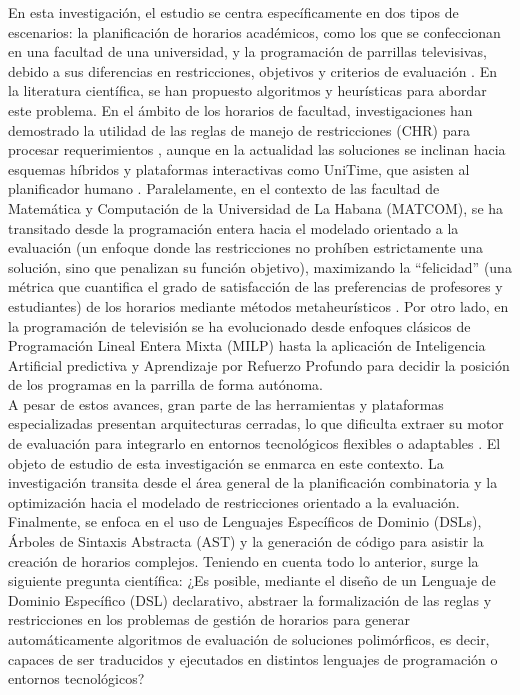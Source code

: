 \documentclass[12pt]{article}
\begin{document}
En esta investigación, el estudio se centra específicamente en dos tipos de escenarios: la planificación de horarios académicos, como los que se confeccionan en una facultad de una universidad, y la programación de parrillas televisivas, debido a sus diferencias en restricciones, objetivos y criterios de evaluación \cite{schaerf1999, garcia2011}. En la literatura científica, se han propuesto algoritmos y heurísticas para abordar este problema. En el ámbito de los horarios de facultad, investigaciones han demostrado la utilidad de las reglas de manejo de restricciones (CHR) para procesar requerimientos \cite{abdennadher2000}, aunque en la actualidad las soluciones se inclinan hacia esquemas híbridos y plataformas interactivas como UniTime, que asisten al planificador humano \cite{muller2010}. Paralelamente, en el contexto de las facultad de Matemática y Computación de la Universidad de La Habana (MATCOM), se ha transitado desde la programación entera hacia el modelado orientado a la evaluación (un enfoque donde las restricciones no prohíben estrictamente una solución, sino que penalizan su función objetivo), maximizando la ``felicidad'' (una métrica que cuantifica el grado de satisfacción de las preferencias de profesores y estudiantes) de los horarios mediante métodos metaheurísticos \cite{burke1997}. Por otro lado, en la programación de televisión se ha evolucionado desde enfoques clásicos de Programación Lineal Entera Mixta (MILP) \cite{garcia2011} hasta la aplicación de Inteligencia Artificial predictiva y Aprendizaje por Refuerzo Profundo \cite{zhou2020} para decidir la posición de los programas en la parrilla de forma autónoma.\\

A pesar de estos avances, gran parte de las herramientas y plataformas especializadas presentan arquitecturas cerradas, lo que dificulta extraer su motor de evaluación para integrarlo en entornos tecnológicos flexibles o adaptables \cite{mccollum2012}. El objeto de estudio de esta investigación se enmarca en este contexto. La investigación transita desde el área general de la planificación combinatoria y la optimización hacia el modelado de restricciones orientado a la evaluación. Finalmente, se enfoca en el uso de Lenguajes Específicos de Dominio (DSLs), Árboles de Sintaxis Abstracta (AST) y la generación de código para asistir la creación de horarios complejos. Teniendo en cuenta todo lo anterior, surge la siguiente pregunta científica: ¿Es posible, mediante el diseño de un Lenguaje de Dominio Específico (DSL) declarativo, abstraer la formalización de las reglas y restricciones en los problemas de gestión de horarios para generar automáticamente algoritmos de evaluación de soluciones polimórficos, es decir, capaces de ser traducidos y ejecutados en distintos lenguajes de programación o entornos tecnológicos?\\
\end{document}
